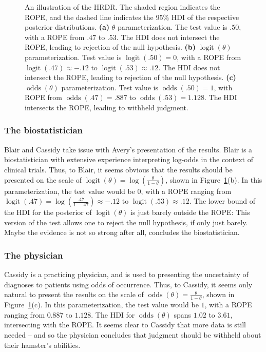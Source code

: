 \documentclass[9pt,twocolumn,twoside]{cidlab-draft}\templatetype{cidlab-invited}
\newcommand{\hdr}{HRDR}
\DeclareMathOperator*{\oddss}{odds}
\DeclareMathOperator*{\logit}{logit}
\begin{document}
\begin{figure}[tb]
    \caption{An illustration of the \hdr{}. The shaded region indicates the ROPE, and the dashed line indicates the 95\% HDI of the respective posterior distributions. \textbf{(a)} $\theta$ parameterization. The test value is $.50$, with a ROPE from $.47$ to $.53$. The HDI does not intersect the ROPE, leading to rejection of the null hypothesis. \textbf{(b)} $\logit(\theta)$ parameterization. Test value is $\logit(.50)=0$, with a ROPE from $\logit(.47)\approx-.12$ to $\logit(.53)\approx.12$. The HDI does not intersect the ROPE, leading to rejection of the null hypothesis. \textbf{(c)} $\oddss(\theta)$ parameterization. Test value is $\oddss(.50)=1$, with ROPE from $\oddss(.47)=.887$ to $\oddss(.53)=1.128$. The HDI intersects the ROPE, leading to withheld judgment.}
    \label{fig:ropes}
\end{figure}

\subsubsection{The biostatistician} Blair and Cassidy take issue with Avery's presentation of the results. Blair is a biostatistician with extensive experience interpreting log-odds in the context of clinical trials. Thus, to Blair, it seems obvious that the results should be presented on the scale of $\logit(\theta)=\log\left(\frac{\theta}{1-\theta}\right)$, shown in Figure~\ref{fig:ropes}(b). In this parameterization, the test value would be 0, with a ROPE ranging from $\logit(.47)=\log\left(\frac{.47}{1-.47}\right)\approx-.12$ to $\logit(.53)\approx.12$. The lower bound of the HDI for the posterior of $\logit(\theta)$ is just barely outside the ROPE: This version of the test allows one to reject the null hypothesis, if only just barely. Maybe the evidence is not so strong after all, concludes the biostatistician. 

\subsubsection{The physician} Cassidy is a practicing physician, and is used to presenting the uncertainty of diagnoses to patients using odds of occurrence. Thus, to Cassidy, it seems only natural to present the results on the scale of $\oddss(\theta)=\frac{\theta}{1-\theta}$, shown in Figure~\ref{fig:ropes}(c). In this parameterization, the test value would be $1$, with a ROPE ranging from $0.887$ to $1.128$. The HDI for $\oddss(\theta)$ spans $1.02$ to $3.61$, intersecting with the ROPE.  
It seems clear to Cassidy that more data is still needed -- and so the physician concludes that judgment should be withheld about their hamster's abilities.\\
\end{document}
